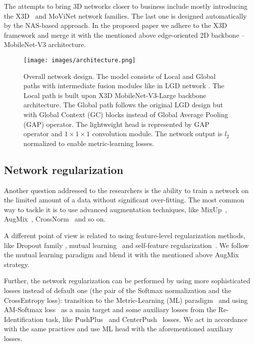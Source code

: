 \documentclass[twoside, twocolumn]{article}
\begin{document}
The attempts to bring 3D networks closer to business include mostly introducing the X3D~\cite{X3D} and MoViNet
\cite{MoViNet} network families. The last one is designed automatically by the NAS-based approach. In the proposed paper
we adhere to the X3D framework and merge it with the mentioned above edge-oriented 2D backbone -- MobileNet-V3
architecture.

\begin{figure*}[t]
\centering
\texttt{[image: images/architecture.png]}
\caption{Overall network design. The model consists of Local and Global paths with intermediate fusion modules like in
LGD network \cite{LGD}. The Local path is built upon X3D MobileNet-V3-Large backbone architecture. The Global path
follows the original LGD design but with Global Context (GC) blocks instead of Global Average Pooling (GAP) operator.
The lightweight head is represented by GAP operator and $1 \times 1 \times 1$ convolution module. The network output is
$l_2$ normalized to enable metric-learning losses.}
\label{fig:architecture}
\end{figure*}

\subsection{Network regularization}

\lettrine[nindent=0em,lines=3]{A}{}nother question addressed to the researchers is the ability to train a network on the
limited amount of a data without significant over-fitting. The most common way to tackle it is to use advanced
augmentation techniques, like MixUp~\cite{MixUp}, AugMix~\cite{AugMix}, CrossNorm~\cite{CrossNorm} and so on.

A different point of view is related to using feature-level regularization methods, like Dropout family
\cite{Dropout, ContinuousDropout, InfoDrop, FocusedDropout}, mutual learning~\cite{MutualLearning} and self-feature
regularization~\cite{SFR}. We follow the mutual learning paradigm and blend it with the mentioned above AugMix strategy.

Further, the network regularization can be performed by using more sophisticated losses instead of default one (the pair
of the Softmax normalization and the CrossEntropy loss): transition to the Metric-Learning (ML) paradigm~\cite{ASLNet}
and using AM-Softmax loss~\cite{AM-Softmax} as a main target and some auxiliary losses from the Re-Identification task,
like PushPlus~\cite{RMNet} and CenterPush~\cite{ASLNet} losses. We act in accordance with the same practices and use ML
head with the aforementioned auxiliary losses.
\end{document}

